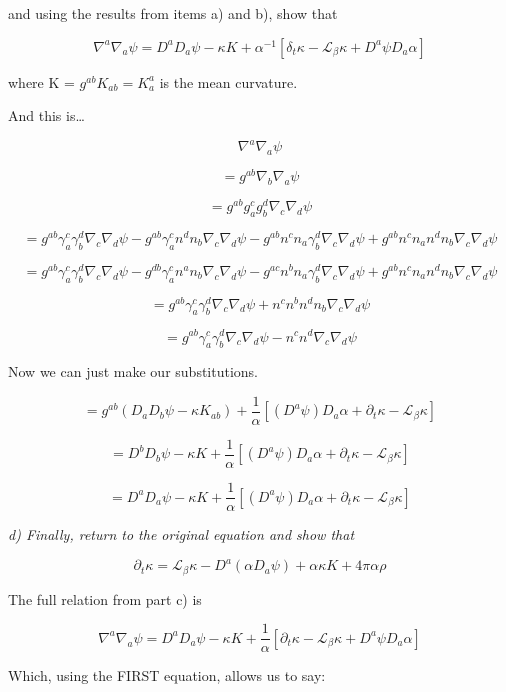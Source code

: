 \documentclass[landscape,letterpaper,10pt,english]{article}
\begin{document}
and using the results from items a) and b), show that

\[ \nabla^a \nabla_a \psi = D^a D_a \psi -\kappa K + \alpha^{-1} [\delta_t \kappa - \mathcal{L}_\beta \kappa + D^a \psi D_a \alpha] \]

where K = \(g^{ab}K_{ab} = K^a_a\) is the mean curvature.

    And this is\ldots{}

\[ \nabla^a \nabla_a \psi \]

\[ = g^{ab} \nabla_b \nabla_a \psi \]

\[ = g^{ab} g^c_a g^d_b \nabla_c \nabla_d \psi \]

\[ = g^{ab} \gamma^c_a \gamma^d_b \nabla_c \nabla_d \psi - g^{ab} \gamma^c_a n^d n_b \nabla_c \nabla_d \psi - g^{ab} n^c n_a \gamma^d_b \nabla_c \nabla_d \psi + g^{ab} n^cn_an^dn_b \nabla_c \nabla_d \psi \]

\[ = g^{ab} \gamma^c_a \gamma^d_b \nabla_c \nabla_d \psi - g^{db} \gamma^c_a n^a n_b \nabla_c \nabla_d \psi - g^{ac} n^b n_a \gamma^d_b \nabla_c \nabla_d \psi + g^{ab} n^cn_an^dn_b \nabla_c \nabla_d \psi \]

\[ = g^{ab} \gamma^c_a \gamma^d_b \nabla_c \nabla_d \psi + n^cn^bn^dn_b \nabla_c \nabla_d \psi \]

\[ = g^{ab} \gamma^c_a \gamma^d_b \nabla_c \nabla_d \psi - n^cn^d \nabla_c \nabla_d \psi \]

Now we can just make our substitutions.

\[ = g^{ab} (D_aD_b\psi - \kappa K_{ab}) + \frac1\alpha [(D^a\psi)D_a \alpha + \partial_t \kappa - \mathcal{L}_\beta \kappa]  \]

\[ = D^bD_b\psi - \kappa K + \frac1\alpha [(D^a\psi)D_a \alpha + \partial_t \kappa - \mathcal{L}_\beta \kappa]  \]

\[ = D^aD_a\psi - \kappa K + \frac1\alpha [(D^a\psi)D_a \alpha + \partial_t \kappa - \mathcal{L}_\beta \kappa]  \]

    \emph{d) Finally, return to the original equation and show that}

\[ \partial_t \kappa = \mathcal{L}_\beta \kappa - D^a(\alpha D_a \psi) + \alpha \kappa K + 4 \pi \alpha \rho\]

    The full relation from part c) is

\[ \nabla^a \nabla_a \psi = D^a D_a \psi -\kappa K + \frac1\alpha [\partial_t \kappa - \mathcal{L}_\beta \kappa + D^a \psi D_a \alpha] \]

Which, using the FIRST equation, allows us to say:
\end{document}
